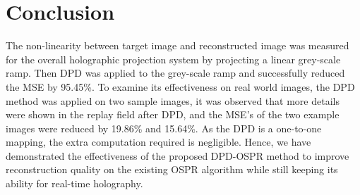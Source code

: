 \section{Conclusion}
The non-linearity between target image and reconstructed image was measured for the overall holographic projection system by projecting a linear grey-scale ramp. Then DPD was applied to the grey-scale ramp and successfully reduced the MSE by 95.45\%. To examine its effectiveness on real world images, the DPD method was applied on two sample images, it was observed that more details were shown in the replay field after DPD, and the MSE's of the two example images were reduced by 19.86\% and 15.64\%. As the DPD is a one-to-one mapping, the extra computation required is negligible. Hence, we have demonstrated the effectiveness of the proposed DPD-OSPR method to improve reconstruction quality on the existing OSPR algorithm while still keeping its ability for real-time holography.




